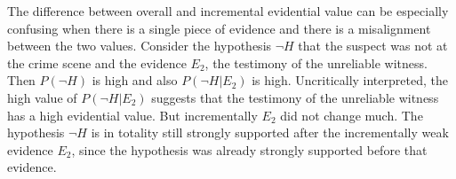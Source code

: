 \documentclass[10pt]{article}
\begin{document}
The difference between overall and incremental evidential value can be especially confusing when there is a single piece of evidence and there is a misalignment between the two values. Consider the hypothesis $\neg H$ that the suspect was not at the crime scene and the evidence $E_2$, the testimony of the unreliable witness. Then $P(\neg H)$ is high and also $P(\neg H | E_2)$ is high. Uncritically interpreted, the high value of $P(\neg H | E_2)$ suggests that the testimony of the unreliable witness has a high evidential value. But incrementally $E_2$ did not change much. The hypothesis $\neg H$ is in totality still strongly supported after the incrementally weak evidence $E_2$, since the hypothesis was already strongly supported before that evidence. 
\end{document}
